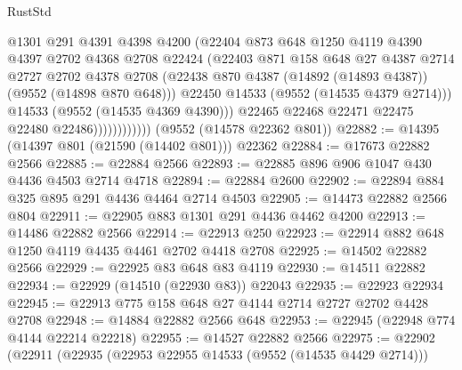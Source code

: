 \begin{lexlean}{RustStd}
\begin{coremodule}
                            @1301
                            @291
                            @4391
                            @4398
                            @4200
                            (@22404
                              @873
                              @648
                              @1250
                              @4119
                              @4390
                              @4397
                              @2702
                              @4368
                              @2708
                              @22424
                              (@22403
                                @871
                                @158
                                @648
                                @27
                                @4387
                                @2714
                                @2727
                                @2702
                                @4378
                                @2708
                                (@22438
                                  @870
                                  @4387
                                  (@14892 (@14893 @4387))
                                  (@9552 (@14898 @870 @648)))
                                @22450
                                @14533
                                (@9552 (@14535 @4379 @2714)))
                              @14533
                              (@9552 (@14535 @4369 @4390)))
                            @22465
                            @22468
                            @22471
                            @22475
                            @22480
                            @22486))))))))))))
    (@9552 (@14578 @22362 @801))
@22882 := @14395 (@14397 @801 (@21590 (@14402 @801))) @22362
@22884 := @17673 @22882 @2566
@22885 := @22884 @2566
@22893 := @22885 @896 @906 @1047 @430 @4436 @4503 @2714 @4718
@22894 := @22884 @2600
@22902 := @22894 @884 @325 @895 @291 @4436 @4464 @2714 @4503
@22905 := @14473 @22882 @2566 @804
@22911 := @22905 @883 @1301 @291 @4436 @4462 @4200
@22913 := @14486 @22882 @2566
@22914 := @22913 @250
@22923 := @22914 @882 @648 @1250 @4119 @4435 @4461 @2702 @4418 @2708
@22925 := @14502 @22882 @2566
@22929 := @22925 @83 @648 @83 @4119
@22930 := @14511 @22882
@22934 := @22929 (@14510 (@22930 @83)) @22043
@22935 := @22923 @22934
@22945 := @22913 @775 @158 @648 @27 @4144 @2714 @2727 @2702 @4428 @2708
@22948 := @14884 @22882 @2566 @648
@22953 := @22945 (@22948 @774 @4144 @22214 @22218)
@22955 := @14527 @22882 @2566
@22975 := @22902
    (@22911
      (@22935
        (@22953 @22955 @14533 (@9552 (@14535 @4429 @2714)))

\end{coremodule}
\end{lexlean}
